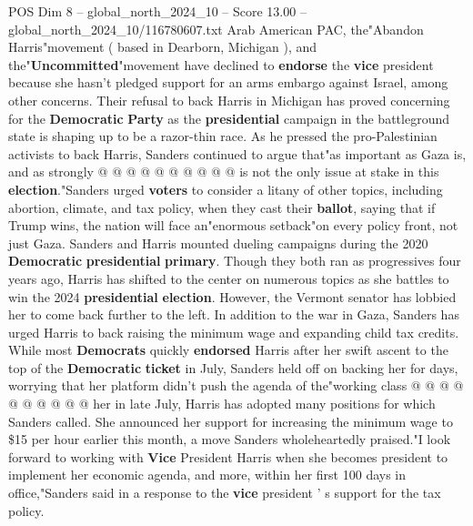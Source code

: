 \begin{textsample}{POS Dim 8 – global\_north\_2024\_10 – Score 13.00 – global\_north\_2024\_10/116780607.txt}
Arab American PAC, the"Abandon Harris"movement ( based in Dearborn, Michigan ), and the"\textbf{Uncommitted}"movement have declined to \textbf{endorse} the \textbf{vice} president because she hasn't pledged support for an arms embargo against Israel, among other concerns.
Their refusal to back Harris in Michigan has proved concerning for the \textbf{Democratic} \textbf{Party} as the \textbf{presidential} campaign in the battleground state is shaping up to be a razor-thin race.
As he pressed the pro-Palestinian activists to back Harris, Sanders continued to argue that"as important as Gaza is, and as strongly @ @ @ @ @ @ @ @ @ @ is not the only issue at stake in this \textbf{election}."Sanders urged \textbf{voters} to consider a litany of other topics, including abortion, climate, and tax policy, when they cast their \textbf{ballot}, saying that if Trump wins, the nation will face an"enormous setback"on every policy front, not just Gaza.
Sanders and Harris mounted dueling campaigns during the 2020 \textbf{Democratic} \textbf{presidential} \textbf{primary}.
Though they both ran as progressives four years ago, Harris has shifted to the center on numerous topics as she battles to win the 2024 \textbf{presidential} \textbf{election}.
However, the Vermont senator has lobbied her to come back further to the left.
In addition to the war in Gaza, Sanders has urged Harris to back raising the minimum wage and expanding child tax credits.
While most \textbf{Democrats} quickly \textbf{endorsed} Harris after her swift ascent to the top of the \textbf{Democratic} \textbf{ticket} in July, Sanders held off on backing her for days, worrying that her platform didn't push the agenda of the"working class @ @ @ @ @ @ @ @ @ @ her in late July, Harris has adopted many positions for which Sanders called.
She announced her support for increasing the minimum wage to \$15 per hour earlier this month, a move Sanders wholeheartedly praised."I look forward to working with \textbf{Vice} President Harris when she becomes president to implement her economic agenda, and more, within her first 100 days in office,"Sanders said in a response to the \textbf{vice} president ' s support for the tax policy.

\end{textsample}
